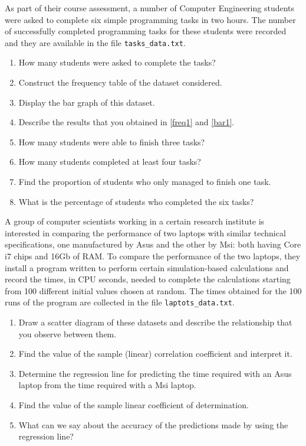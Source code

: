 \documentclass[12pt,a4]{report}
\newcounter{ejercicio}\def\theejercicio{\arabic{ejercicio}.}
\newenvironment{ejer}[1]{\noindent{\stepcounter{ejercicio}\textbf{Exercise \theejercicio}}\hskip0.2cm{
#1}}{\vskip0.2cm}
\begin{document}
\begin{ejer}
As part of their course assessment, a number of Computer Engineering students were asked to complete six simple programming tasks in two hours. The number of successfully completed programming tasks for these students were recorded and they are available in the file \texttt{tasks\_data.txt}. 
\begin{enumerate}[label=(\alph*),ref=\emph{(\alph*)}]
\item How many students were asked to complete the tasks?
\item Construct the frequency table of the dataset considered.\label{freq1}
\item Display the bar graph of this dataset.\label{bar1}
\item Describe the results that you obtained in \ref{freq1} and \ref{bar1}.
\item How many students were able to finish three tasks?
\item How many students completed at least four tasks?
\item Find the proportion of students who only managed to finish one task.
\item What is the percentage of students who completed the six tasks?
\end{enumerate}
\end{ejer}


\vspace{1cm}



\begin{ejer}
A group of computer scientists working in a certain research institute is interested in comparing the performance of two laptops with similar technical specifications, one manufactured by Asus and the other by Msi: both having Core i7 chips and 16Gb of RAM. To compare the performance of the two laptops, they install a program written to perform certain simulation-based calculations and record the times, in CPU seconds, needed to complete the calculations starting from 100 different initial values chosen at random. The times obtained for the 100 runs of the program are collected in the file \texttt{laptots\_data.txt}.
\begin{enumerate}[label=(\alph*),ref=\emph{(\alph*)}]
\item Draw a scatter diagram of these datasets and describe the relationship that you observe between them. 
\item Find the value of the sample (linear) correlation coefficient and interpret it.
\item Determine the regression line for predicting the time required with an Asus laptop from the time required with a Msi laptop.
\item Find the value of the sample linear coefficient of determination.
\item What can we say about the accuracy of the predictions made by using the regression line?
\end{enumerate}
\end{ejer}
\end{document}
